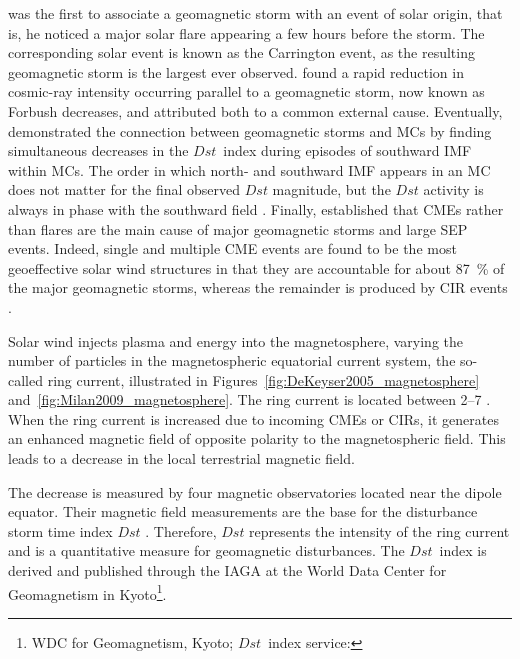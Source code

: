 \citet{Carrington1859} was the first to associate a geomagnetic storm with an event of solar origin, that is, he noticed a major solar flare appearing a few hours before the storm. The corresponding solar event is known as the Carrington event, as the resulting geomagnetic storm is the largest ever observed. \citet{Forbush1937} found a rapid reduction in cosmic-ray intensity occurring parallel to a geomagnetic storm, now known as Forbush decreases, and attributed both to a common external cause. Eventually, \citet{Wilson1987} demonstrated the connection between geomagnetic storms and MCs by finding simultaneous decreases in the $Dst$~index during episodes of southward IMF within MCs. The order in which north- and southward IMF appears in an MC does not matter for the final observed $Dst$ magnitude, but the $Dst$ activity is always in phase with the southward field \citep{Zhang1988}. Finally, \citet{Gosling1993} established that CMEs rather than flares are the main cause of major geomagnetic storms and large SEP events. Indeed, single and multiple CME events are found to be the most geoeffective solar wind structures in that they are accountable for about \SI{87}{\%} of the major geomagnetic storms, whereas the remainder is produced by CIR events \citep{Zhang2007}.

Solar wind injects plasma and energy into the magnetosphere, varying the number of particles in the magnetospheric equatorial current system, the so-called ring current, illustrated in Figures~\ref{fig:DeKeyser2005_magnetosphere} and~\ref{fig:Milan2009_magnetosphere}. The ring current is located between \SIrange{2}{7}{\RE} \citep{Gonzalez1994}. When the ring current is increased due to incoming CMEs or CIRs, it generates an enhanced magnetic field of opposite polarity to the magnetospheric field. This leads to a decrease in the local terrestrial magnetic field.

The decrease is measured by four magnetic observatories located near the dipole equator. Their magnetic field measurements are the base for the disturbance storm time index $Dst$ \citep{Sugiura1991}. Therefore, $Dst$ represents the intensity of the ring current and is a quantitative measure for geomagnetic disturbances. The $Dst$~index is derived and published through the IAGA at the World Data Center for Geomagnetism in Kyoto\footnote{WDC for Geomagnetism, Kyoto; $Dst$~index service: }.

